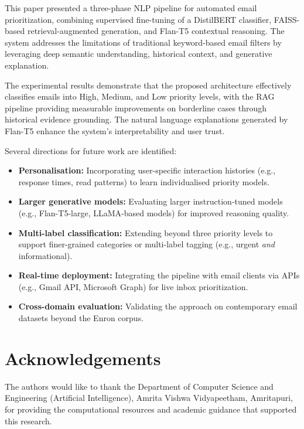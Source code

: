 \documentclass[3p,times,procedia]{elsarticle}
\begin{document}
This paper presented a three-phase NLP pipeline for automated email prioritization, combining supervised fine-tuning of a DistilBERT classifier, FAISS-based retrieval-augmented generation, and Flan-T5 contextual reasoning. The system addresses the limitations of traditional keyword-based email filters by leveraging deep semantic understanding, historical context, and generative explanation.

The experimental results demonstrate that the proposed architecture effectively classifies emails into High, Medium, and Low priority levels, with the RAG pipeline providing measurable improvements on borderline cases through historical evidence grounding. The natural language explanations generated by Flan-T5 enhance the system's interpretability and user trust.

Several directions for future work are identified:

\begin{itemize}
\item \textbf{Personalisation:} Incorporating user-specific interaction histories (e.g., response times, read patterns) to learn individualised priority models.
\item \textbf{Larger generative models:} Evaluating larger instruction-tuned models (e.g., Flan-T5-large, LLaMA-based models) for improved reasoning quality.
\item \textbf{Multi-label classification:} Extending beyond three priority levels to support finer-grained categories or multi-label tagging (e.g., urgent \textit{and} informational).
\item \textbf{Real-time deployment:} Integrating the pipeline with email clients via APIs (e.g., Gmail API, Microsoft Graph) for live inbox prioritization.
\item \textbf{Cross-domain evaluation:} Validating the approach on contemporary email datasets beyond the Enron corpus.
\end{itemize}


\section*{Acknowledgements}

The authors would like to thank the Department of Computer Science and Engineering (Artificial Intelligence), Amrita Vishwa Vidyapeetham, Amritapuri, for providing the computational resources and academic guidance that supported this research.
\end{document}
